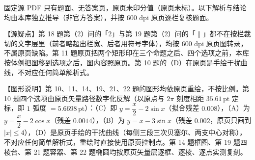 

\begin{gktip}
固定源 PDF 只有题面、无答案页，原页未印分值（原页未标）。以下解析与结论均由本库独立推导（非官方答案），并按 600 dpi 原页逐栏复核题面。

【源疑点】第 18 题第（2）问的「2」与第 19 题第（2）问的「$\parallel$」都不在按栏裁切的文字层里（前者略超出栏宽、后者用符号字体），均按 600 dpi 原页图转录，不属原页缺陷。第 11 题原页把两个矩形印在三个命题之后、四个选项之前，本库按体例把图移到选项之后，图内容照原页。第 10 题的（D）在原页是手绘干扰曲线，不对应任何简单解析式。

【图形说明】第 10、11、14、19、21、22 题的图形均依原页重绘，不按比例。第 10 题四个选项由原页矢量路径数字化反解（以原点与 $2\pi$ 刻度相距 $35.61\,\mathrm{pt}$ 定标，即 $1$ 弧度 $=5.6698\,\mathrm{pt}$）：（C）即 $y=\dfrac x2-2\sin x$（拟合残差 $0.008$），（A）为 $y=\dfrac x2-2\cos x$（残差 $0.0014$），（B）为 $y=x-3\sin x$（残差 $0.002$，原页只画到 $|x|\leqslant4$），（D）是原页手绘的干扰曲线（每侧三段三次贝塞尔、两支中心对称），不对应任何简单解析式，重绘时直接使用原页控制点。第 14 题框图、第 19 题四棱台、第 21 题容器、第 22 题椭圆均按原页矢量层逐框、逐棱、逐点实测复刻。
\end{gktip}

